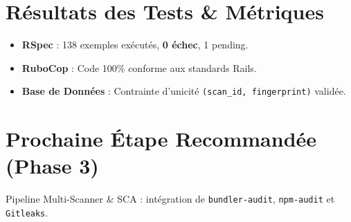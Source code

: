 \documentclass[11pt,a4paper]{article}
\begin{document}
\section{Résultats des Tests \& Métriques}
\begin{itemize}
    \item \textbf{RSpec} : 138 exemples exécutés, \textbf{0 échec}, 1 pending.
    \item \textbf{RuboCop} : Code 100\% conforme aux standards Rails.
    \item \textbf{Base de Données} : Contrainte d'unicité \texttt{(scan\_id, fingerprint)} validée.
\end{itemize}

\section{Prochaine Étape Recommandée (Phase 3)}
Pipeline Multi-Scanner \& SCA : intégration de \texttt{bundler-audit}, \texttt{npm-audit} et \texttt{Gitleaks}.
\end{document}
